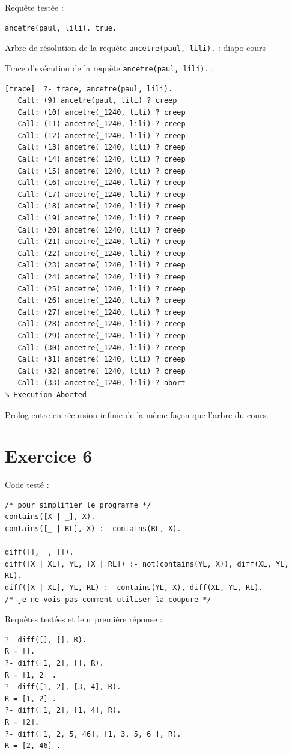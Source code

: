 \documentclass{article}
\begin{document}
Requête testée :
\begin{verbatim}
ancetre(paul, lili). true.
\end{verbatim}

Arbre de résolution de la requète \texttt{ancetre(paul, lili).} :
diapo cours

Trace d'exécution de la requète \texttt{ancetre(paul, lili).} :
\begin{verbatim}
[trace]  ?- trace, ancetre(paul, lili).
   Call: (9) ancetre(paul, lili) ? creep
   Call: (10) ancetre(_1240, lili) ? creep
   Call: (11) ancetre(_1240, lili) ? creep
   Call: (12) ancetre(_1240, lili) ? creep
   Call: (13) ancetre(_1240, lili) ? creep
   Call: (14) ancetre(_1240, lili) ? creep
   Call: (15) ancetre(_1240, lili) ? creep
   Call: (16) ancetre(_1240, lili) ? creep
   Call: (17) ancetre(_1240, lili) ? creep
   Call: (18) ancetre(_1240, lili) ? creep
   Call: (19) ancetre(_1240, lili) ? creep
   Call: (20) ancetre(_1240, lili) ? creep
   Call: (21) ancetre(_1240, lili) ? creep
   Call: (22) ancetre(_1240, lili) ? creep
   Call: (23) ancetre(_1240, lili) ? creep
   Call: (24) ancetre(_1240, lili) ? creep
   Call: (25) ancetre(_1240, lili) ? creep
   Call: (26) ancetre(_1240, lili) ? creep
   Call: (27) ancetre(_1240, lili) ? creep
   Call: (28) ancetre(_1240, lili) ? creep
   Call: (29) ancetre(_1240, lili) ? creep
   Call: (30) ancetre(_1240, lili) ? creep
   Call: (31) ancetre(_1240, lili) ? creep
   Call: (32) ancetre(_1240, lili) ? creep
   Call: (33) ancetre(_1240, lili) ? abort
% Execution Aborted
\end{verbatim}

Prolog entre en récursion infinie de la même façon que l'arbre du cours.

\section*{Exercice 6}

Code testé :
\begin{verbatim}
/* pour simplifier le programme */
contains([X | _], X).
contains([_ | RL], X) :- contains(RL, X).

diff([], _, []).
diff([X | XL], YL, [X | RL]) :- not(contains(YL, X)), diff(XL, YL, RL).
diff([X | XL], YL, RL) :- contains(YL, X), diff(XL, YL, RL).
/* je ne vois pas comment utiliser la coupure */
\end{verbatim}

Requêtes testées et leur première réponse :
\begin{verbatim}
?- diff([], [], R).
R = [].
?- diff([1, 2], [], R).
R = [1, 2] .
?- diff([1, 2], [3, 4], R).
R = [1, 2] .
?- diff([1, 2], [1, 4], R).
R = [2].
?- diff([1, 2, 5, 46], [1, 3, 5, 6 ], R).
R = [2, 46] .
\end{verbatim}
\end{document}
